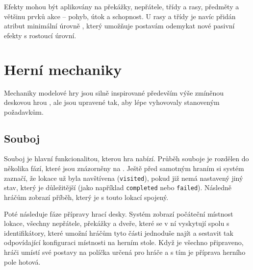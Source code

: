 Efekty mohou být aplikovány na překážky, nepřátele, třídy a rasy, předměty a většinu prvků akce -- pohyb, útok a schopnost. U rasy a třídy je navíc přidán atribut minimální úrovně , který umožňuje postavám odemykat nové pasivní efekty s rostoucí úrovní.


\section{Herní mechaniky}
\label{sec:design_mechanics}

Mechaniky modelové hry jsou silně inspirované především výše zmíněnou deskovou hrou , ale jsou upravené tak, aby lépe vyhovovaly stanoveným požadavkům.


\subsection{Souboj}
\label{subsec:design_encounter}

Souboj je hlavní funkcionalitou, kterou hra nabízí. Průběh souboje je rozdělen do několika fází, které jsou znázorněny na . Ještě před samotným hraním si systém zaznačí, že lokace už byla navštívena (\texttt{visited}), pokud již nemá nastavený jiný stav, který je důležitější (jako například \texttt{completed} nebo \texttt{failed}). Následně hráčům zobrazí příběh, který je s touto lokací spojený.

Poté následuje fáze přípravy hrací desky. Systém zobrazí počáteční místnost lokace, všechny nepřátele, překážky a dveře, které se v ní vyskytují spolu s identifikátory, které umožní hráčům tyto části jednoduše najít a sestavit tak odpovídající konfiguraci místnosti na herním stole. Když je všechno připraveno, hráči umístí své postavy na políčka určená pro hráče a s tím je příprava herního pole hotová.

